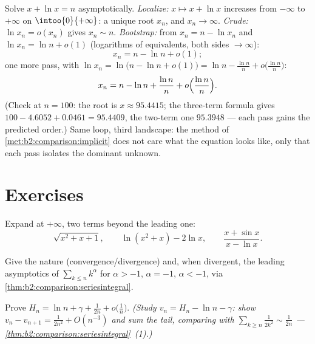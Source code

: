 \begin{example}\label{ex:b2:comparison:xplusln}
Solve $x + \ln x = n$ asymptotically. \emph{Localize:} $x
\mapsto x + \ln x$ increases from $-\infty$ to $+\infty$ on
$\intoo{0}{+\infty}$: a unique root $x_n$, and $x_n \to \infty$.
\emph{Crude:} $\ln x_n = o(x_n)$ gives $x_n \sim n$.
\emph{Bootstrap:} from $x_n = n - \ln x_n$ and $\ln x_n = \ln n
+ o(1)$ (logarithms of equivalents, both sides $\to \infty$):
\[
x_n = n - \ln n + o(1) ;
\]
one more pass, with $\ln x_n = \ln\bigl(n - \ln n + o(1)\bigr) =
\ln n - \frac{\ln n}{n} + o\bigl(\frac{\ln n}n\bigr)$:
\[
x_n = n - \ln n + \frac{\ln n}{n} +
o\Bigl(\frac{\ln n}{n}\Bigr).
\]
(Check at $n = 100$: the root is $x \approx 95.4415$; the
three-term formula gives $100 - 4.6052 + 0.0461 = 95.4409$, the
two-term one $95.3948$ --- each pass gains the predicted
order.) Same loop, third landscape: the method of
\cref{met:b2:comparison:implicit} does not care what the
equation looks like, only that each pass isolates the dominant
unknown.
\end{example}

\section{Exercises}

\begin{exercise}[$\star$]\label{exo:b2:comparison:1}
Expand at $+\infty$, two terms beyond the leading one:
\[
\sqrt{x^2 + x + 1} ,
\qquad
\ln(x^2 + x) - 2\ln x,
\qquad
\frac{x + \sin x}{x - \ln x} .
\]
\end{exercise}

\begin{exercise}[$\star$]\label{exo:b2:comparison:2}
Give the nature (convergence/divergence) and, when divergent, the
leading asymptotics of $\sum_{k \leq n} k^\alpha$ for $\alpha >
-1$, $\alpha = -1$, $\alpha < -1$, via
\cref{thm:b2:comparison:seriesintegral}.
\end{exercise}

\begin{exercise}[$\star\star$]\label{exo:b2:comparison:3}
Prove $H_n = \ln n + \gamma + \frac{1}{2n} + o\bigl(\frac1n\bigr)$.
\emph{(Study $v_n = H_n - \ln n - \gamma$: show $v_n - v_{n+1} =
\frac{1}{2n^2} + O(n^{-3})$ and sum the tail, comparing with
$\sum_{k \geq n} \frac{1}{2k^2} \sim \frac{1}{2n}$ ---
\cref{thm:b2:comparison:seriesintegral}~(1).)}
\end{exercise}

